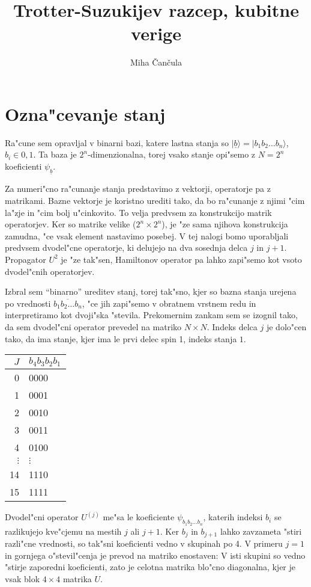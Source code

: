 \documentclass[a4paper,10pt]{article}
\title{Trotter-Suzukijev razcep, kubitne verige}
\author{Miha \v Can\v cula}
\newcommand{\uvec}[1]{\ensuremath{\underline{#1}}}
\newcommand{\bb}{
  \ensuremath{b_1 b_2 \ldots b_n}
}
\newcommand{\psibb}{
  \ensuremath{\psi_{\bb}}
}
\begin{document}
\maketitle

\section{Ozna"cevanje stanj}

Ra"cune sem opravljal v binarni bazi, katere lastna stanja so $|\uvec{b}\rangle = |b_1 b_2 \ldots b_n\rangle$, $b_i \in {0,1}$. 
Ta baza je $2^n$-dimenzionalna, torej vsako stanje opi"semo z $N = 2^n$ koeficienti $\psi_{\uvec{b}}$. 

Za numeri"cno ra"cunanje stanja predstavimo z vektorji, operatorje pa z matrikami. 
Bazne vektorje je koristno urediti tako, da bo ra"cunanje z njimi "cim la"zje in "cim bolj u"cinkovito. 
To velja predvsem za konstrukcijo matrik operatorjev. 
Ker so matrike velike ($2^n \times 2^n$), je "ze sama njihova konstrukcija zamudna, "ce vsak element nastavimo posebej. 
V tej nalogi bomo uporabljali predvsem dvodel"cne operatorje, ki delujejo na dva sosednja delca $j$ in $j+1$. 
Propagator $U^{2}$ je "ze tak"sen, Hamiltonov operator pa lahko zapi"semo kot vsoto dvodel"cnih operatorjev. 

Izbral sem ``binarno'' ureditev stanj, torej tak"sno, kjer so bazna stanja urejena po vrednosti $\overline{b_1 b_2 \ldots b_n}$, "ce jih zapi"semo v obratnem vrstnem redu in interpretiramo kot dvoji"ska "stevila. 
Prekomernim zankam sem se izognil tako, da sem dvodel"cni operator prevedel na matriko $N\times N$. 
Indeks delca $j$ je dolo"cen tako, da ima stanje, kjer ima le prvi delec spin 1, indeks stanja $1$.

\begin{table}[H]
\centering
 \begin{tabular}{r|l}
  $J$ & $b_4 b_3 b_2 b_1$ \\
  \hline
  0 & 0000 \\
  1 & 0001 \\
  2 & 0010 \\
  3 & 0011 \\
  4 & 0100 \\
  $\vdots$ & $\vdots$ \\
  14 & 1110 \\
  15 & 1111
 \end{tabular}
\end{table}



Dvodel"cni operator $U^{(j)}$ me"sa le koeficiente $\psibb$, katerih indeksi $b_i$ se razlikujejo kve"cjemu na mestih $j$ ali $j+1$.
Ker $b_j$ in $b_{j+1}$ lahko zavzameta "stiri razli"cne vrednosti, so tak"sni koeficienti vedno v skupinah po 4. 
V primeru $j=1$ in gornjega o"stevil"cenja je prevod na matriko enostaven: 
V isti skupini so vedno "stirje zaporedni koeficienti, zato je celotna matrika blo"cno diagonalna, kjer je vsak blok $4\times 4$ matrika $U$. 
\end{document}
